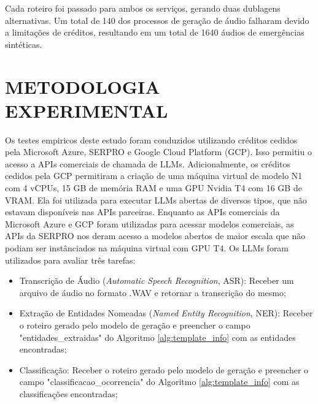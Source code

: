 \documentclass{IEEEphot}
\begin{document}
Cada roteiro foi passado para ambos os serviços, gerando duas dublagens alternativas. Um total de 140 dos processos de geração de áudio falharam devido a limitações de créditos, resultando em um total de 1640 áudios de emergências sintéticas.

\section{METODOLOGIA EXPERIMENTAL}

Os testes empiricos deste estudo foram conduzidos utilizando créditos cedidos pela Microsoft Azure, SERPRO e Google Cloud Platform (GCP). Isso permitiu o acesso a APIs comerciais de chamada de LLMs. Adicionalmente, os créditos cedidos pela GCP permitiram a criação de uma máquina virtual de modelo N1 com 4 vCPUs, 15 GB de memória RAM e uma GPU Nvidia T4 com 16 GB de VRAM. Ela foi utilizada para executar LLMs abertas de diversos tipos, que não estavam disponíveis nas APIs parceiras. Enquanto as APIs comerciais da Microsoft Azure e GCP foram utilizadas para acessar modelos comerciais, as APIs da SERPRO nos deram acesso a modelos abertos de maior escala que não podiam ser instânciados na máquina virtual com GPU T4. Os LLMs foram utilizados para avaliar três tarefas:

\begin{itemize}
    \item Transcrição de Áudio (\textit{Automatic Speech Recognition}, ASR): Receber um arquivo de áudio no formato .WAV e retornar a transcrição do mesmo;
    \item Extração de Entidades Nomeadas (\textit{Named Entity Recognition}, NER): Receber o roteiro gerado pelo modelo de geração e preencher o campo "entidades\_extraidas" do Algoritmo \ref{alg:template_info} com as entidades encontradas;
    \item Classificação: Receber o roteiro gerado pelo modelo de geração e preencher o campo "classificacao\_ocorrencia" do Algoritmo \ref{alg:template_info} com as classificações encontradas;
\end{itemize}
\end{document}

